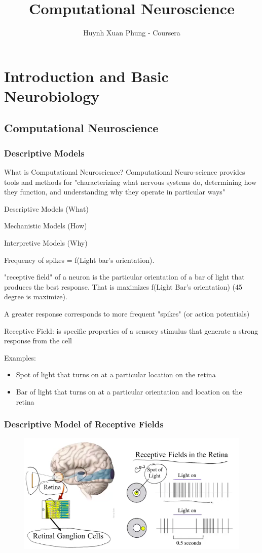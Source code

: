 \documentclass{book}
\title{Computational Neuroscience}
\author{Huynh Xuan Phung - Coursera}
\date{ }
\begin{document}
 
\maketitle
 
\tableofcontents

\chapter{Introduction and Basic Neurobiology}

\section{Computational Neuroscience}
\subsection{Descriptive Models}

What is Computational Neuroscience?
Computational Neuro-science provides tools and methods for "characterizing what nervous systems do, determining how they function, and understanding why they operate in particular ways"

Descriptive Models (What)

Mechanistic Models (How)

Interpretive Models (Why)

Frequency of spikes = f(Light bar's orientation). 

"receptive field" of a neuron is the particular orientation of a bar of light that produces the best response. That is maximizes f(Light Bar's orientation) (45 degree is maximize).

A greater response corresponds to more frequent "spikes" (or action potentials)

Receptive Field: is specific properties of a sensory stimulus that generate a strong response from the cell

Examples:
\begin{itemize}
	\item {Spot of light that turns on at a particular location on the retina}
	\item{Bar of light that turns on at a particular orientation and location on the retina}
\end{itemize} 

\subsection{Descriptive Model of Receptive Fields}
\begin{figure}[h]
\centering
\includegraphics[width=0.7\linewidth]{figures/ReceptiveField_Retina}
\caption{}
\label{fig:receptivefieldretina}
\end{figure}
\end{document}

